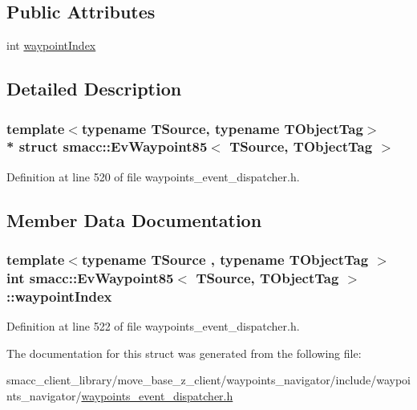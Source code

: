 \subsection*{Public Attributes}
\begin{DoxyCompactItemize}
\item 
int \hyperlink{structsmacc_1_1EvWaypoint85_aaa5ec1912a071285101c3b721203ce66}{waypoint\+Index}
\end{DoxyCompactItemize}


\subsection{Detailed Description}
\subsubsection*{template$<$typename T\+Source, typename T\+Object\+Tag$>$\\*
struct smacc\+::\+Ev\+Waypoint85$<$ T\+Source, T\+Object\+Tag $>$}



Definition at line 520 of file waypoints\+\_\+event\+\_\+dispatcher.\+h.



\subsection{Member Data Documentation}
\subsubsection[{\texorpdfstring{waypoint\+Index}{waypointIndex}}]{\setlength{\rightskip}{0pt plus 5cm}template$<$typename T\+Source , typename T\+Object\+Tag $>$ int {\bf smacc\+::\+Ev\+Waypoint85}$<$ T\+Source, T\+Object\+Tag $>$\+::waypoint\+Index}\hypertarget{structsmacc_1_1EvWaypoint85_aaa5ec1912a071285101c3b721203ce66}{}\label{structsmacc_1_1EvWaypoint85_aaa5ec1912a071285101c3b721203ce66}


Definition at line 522 of file waypoints\+\_\+event\+\_\+dispatcher.\+h.



The documentation for this struct was generated from the following file\+:\begin{DoxyCompactItemize}
\item 
smacc\+\_\+client\+\_\+library/move\+\_\+base\+\_\+z\+\_\+client/waypoints\+\_\+navigator/include/waypoints\+\_\+navigator/\hyperlink{waypoints__event__dispatcher_8h}{waypoints\+\_\+event\+\_\+dispatcher.\+h}\end{DoxyCompactItemize}
